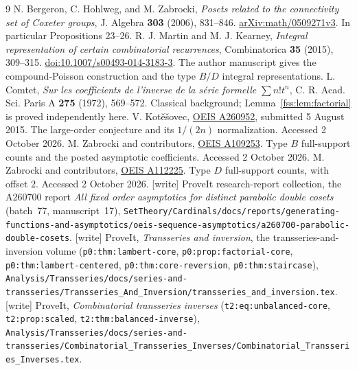 \documentclass[11pt]{article}
\begin{document}
\begingroup\raggedright
\begin{thebibliography}{9}
 N. Bergeron, C. Hohlweg, and M. Zabrocki, \emph{Posets related to the connectivity set of Coxeter groups}, J. Algebra \textbf{303} (2006), 831--846. \href{https://arxiv.org/abs/math/0509271v3}{arXiv:math/0509271v3}. In particular Propositions 23--26.
 R. J. Martin and M. J. Kearney, \emph{Integral representation of certain combinatorial recurrences}, Combinatorica \textbf{35} (2015), 309--315. \href{https://doi.org/10.1007/s00493-014-3183-3}{doi:10.1007/s00493-014-3183-3}. The author manuscript gives the compound-Poisson construction and the type $B/D$ integral representations.
 L. Comtet, \emph{Sur les coefficients de l'inverse de la s\'erie formelle $\sum n!t^n$}, C. R. Acad. Sci. Paris A \textbf{275} (1972), 569--572. Classical background; Lemma~\ref{fss:lem:factorial} is proved independently here.
 V. Kot\v e\v sovec, \href{https://oeis.org/A260952}{OEIS A260952}, submitted 5 August 2015. The large-order conjecture and its $1/(2n)$ normalization. Accessed 2 October 2026.
 M. Zabrocki and contributors, \href{https://oeis.org/A109253}{OEIS A109253}. Type $B$ full-support counts and the posted asymptotic coefficients. Accessed 2 October 2026.
 M. Zabrocki and contributors, \href{https://oeis.org/A112225}{OEIS A112225}. Type $D$ full-support counts, with offset $2$. Accessed 2 October 2026.
 [write] ProveIt research-report collection, the A260700
report \emph{All fixed order asymptotics for distinct parabolic double
cosets} (batch~77, manuscript~17),
\nolinkurl{SetTheory/Cardinals/docs/reports/generating-functions-and-asymptotics/oeis-sequence-asymptotics/a260700-parabolic-double-cosets}.
 [write] ProveIt, \emph{Transseries and inversion}, the
transseries-and-inversion volume (\texttt{p0:thm:lambert-core},
\texttt{p0:prop:factorial-core}, \texttt{p0:thm:lambert-centered},
\texttt{p0:thm:core-reversion}, \texttt{p0:thm:staircase}),
\nolinkurl{Analysis/Transseries/docs/series-and-transseries/Transseries_And_Inversion/transseries_and_inversion.tex}.
 [write] ProveIt, \emph{Combinatorial transseries
inverses} (\texttt{t2:eq:unbalanced-core}, \texttt{t2:prop:scaled},
\texttt{t2:thm:balanced-inverse}),
\nolinkurl{Analysis/Transseries/docs/series-and-transseries/Combinatorial_Transseries_Inverses/Combinatorial_Transseries_Inverses.tex}.
\end{thebibliography}
\endgroup
\end{document}
